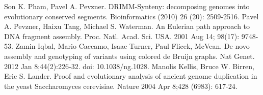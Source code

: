 \documentclass[a4paper,12pt]{scrartcl}
\begin{document}
\begin{thebibliography}{9}
	Son K. Pham, Pavel A. Pevzner.
	DRIMM-Synteny: decomposing genomes into evolutionary conserved segments.
	Bioinformatics (2010)  26  (20):  2509-2516.
	Pavel A. Pevzner, Haixu Tang, Michael S. Waterman.
	An Eulerian path approach to DNA fragment assembly.
	Proc. Natl. Acad. Sci. USA. 2001 Aug 14; 98(17): 9748-53.
	Zamin Iqbal, Mario Caccamo, Isaac Turner, Paul Flicek, McVean.
	De novo assembly and genotyping of variants using colored de Bruijn graphs.
	Nat Genet. 2012 Jan 8;44(2):226-32. doi: 10.1038/ng.1028.
	Manolis Kellis, Bruce W. Birren, Eric S. Lander.
	Proof and evolutionary analysis of ancient genome duplication in the yeast Saccharomyces cerevisiae.
	Nature 2004 Apr 8;428 (6983): 617-24.
\end{thebibliography}
\end{document}
